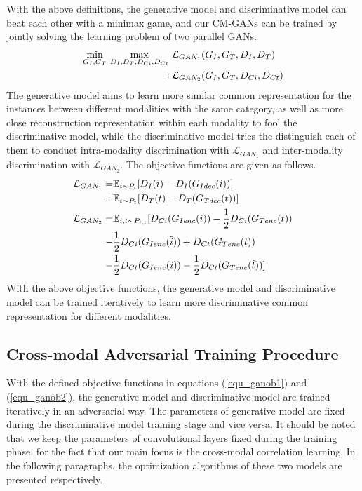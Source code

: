\documentclass[journal]{IEEEtran}
\begin{document}
With the above definitions, the generative model and discriminative model can beat each other with a minimax game, and our CM-GANs can be trained by jointly solving the learning problem of two parallel GANs.
\begin{align}
\underset{G_I,G_T}{\textrm{min}}\ \underset{D_I,D_T,D_{Ci},D_{Ct}}{\textrm{max}}\ &\mathcal{L}_{GAN_1}(G_I,G_T,D_I,D_T) \notag \\
+&\mathcal{L}_{GAN_2}(G_I,G_T,D_{Ci},D_{Ct})
\label{equ_gan0}
\end{align}
The generative model aims to learn more similar common representation for the instances between different modalities with the same category, as well as more close reconstruction representation within each modality to fool the discriminative model, while the discriminative model tries the distinguish each of them to conduct intra-modality discrimination with $\mathcal{L}_{GAN_1}$ and inter-modality discrimination with $\mathcal{L}_{GAN_2}$. 
The objective functions are given as follows.
\begin{align}
\mathcal{L}_{GAN_1}=&\mathbb{E}_{i\sim P_i}[D_I(i)-D_I(G_{Idec}(i))] \notag \\ +&\mathbb{E}_{t\sim P_t}[D_T(t)-D_T(G_{Tdec}(t))] \label{equ_ganob1}\\
\mathcal{L}_{GAN_2}=&\mathbb{E}_{i,t\sim P_{i,t}}[D_{Ci}(G_{Ienc}(i))-\frac{1}{2}D_{Ci}(G_{Tenc}(t)) \notag \\ -&\frac{1}{2}D_{Ci}(G_{Ienc}(\hat{i}))
+D_{Ct}(G_{Tenc}(t)) \notag \\-&\frac{1}{2}D_{Ct}(G_{Ienc}(i))-\frac{1}{2}D_{Ct}(G_{Tenc}(\hat{t}))] 
\label{equ_ganob2}
\end{align}
With the above objective functions, the generative model and discriminative model can be trained iteratively to learn more discriminative common representation for different modalities.

\subsection{Cross-modal Adversarial Training Procedure}

With the defined objective functions in equations (\ref{equ_ganob1}) and (\ref{equ_ganob2}), the generative model and discriminative model are trained iteratively in an adversarial way. The parameters of generative model are fixed during the discriminative model training stage and vice versa. It should be noted that we keep the parameters of convolutional layers fixed during the training phase, for the fact that our main focus is the cross-modal correlation learning. In the following paragraphs, the optimization algorithms of these two models are presented respectively.
\end{document}
